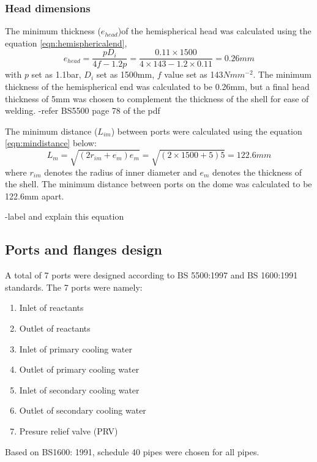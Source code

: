 \subsubsection{Head dimensions}
The minimum thickness ($e_{head}$)of the hemispherical head was calculated using the equation \ref{eqn:hemisphericalend},
\begin{equation}
    e_{head} = \frac{pD_i}{4f-1.2p} = \frac{0.11 \times 1500}{4 \times 143 - 1.2 \times 0.11} = 0.26mm
    \label{eqn:hemisphericalend}
\end{equation}
with $p$ set as 1.1bar, $D_i$ set as 1500mm, $f$ value set as 143$Nmm^{-2}$.  The minimum thickness of the hemispherical end was calculated to be 0.26mm, but a final head thickness of 5mm was chosen to complement the thickness of the shell for ease of welding. 
-refer BS5500 page 78 of the pdf

The minimum distance ($L_{im}$) between ports were calculated using the equation \ref{eqn:mindistance} below:
\begin{equation}
    L_m = \sqrt{(2r_{im}+e_{m})e_m} = \sqrt{(2 \times 1500 + 5)5} = 122.6mm
    \label{eqn:mindistance}
\end{equation}
where $r_{im}$ denotes the radius of inner diameter and $e_m$ denotes the thickness of the shell. The minimum distance between ports on the dome was calculated to be 122.6mm apart. 

-label and explain this equation
\subsection{Ports and flanges design}
A total of 7 ports were designed according to BS 5500:1997 and BS 1600:1991 standards. The 7 ports were namely:
\begin{enumerate}
    \item Inlet of reactants
    \item Outlet of reactants
    \item Inlet of primary cooling water
    \item Outlet of primary cooling water
    \item Inlet of secondary cooling water
    \item Outlet of secondary cooling water
    \item Presure relief valve (PRV)
\end{enumerate}
Based on BS1600: 1991, schedule 40 pipes were chosen for all pipes. 
